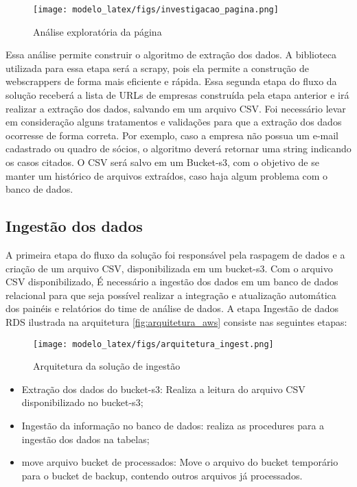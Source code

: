 \begin{figure}[H]
    \centering
    \texttt{[image: modelo\_latex/figs/investigacao\_pagina.png]}
    \caption{Análise exploratória da página}
    \label{fig:investigacao_pagina}
\end{figure}

Essa análise permite construir o algoritmo de extração dos dados. A biblioteca utilizada para essa etapa será a scrapy, pois ela permite a construção de webscrappers de forma mais eficiente e rápida. Essa segunda etapa do fluxo da solução receberá a lista de URLs de empresas construída pela etapa anterior e irá realizar a extração dos dados, salvando em um arquivo CSV. Foi necessário levar em consideração alguns tratamentos e validações para que a extração dos dados ocorresse de forma correta. Por exemplo, caso a empresa não possua um e-mail cadastrado ou quadro de sócios, o algoritmo deverá retornar uma string indicando os casos citados. O CSV será salvo em um Bucket-s3, com o objetivo de se manter um histórico de arquivos extraídos, caso haja algum problema com o banco de dados.

\subsection{Ingestão dos dados}

A primeira etapa do fluxo da solução foi responsável pela raspagem de dados e a criação de um arquivo CSV, disponibilizada em um bucket-s3. Com o arquivo CSV disponibilizado, É necessário a ingestão dos dados em um banco de dados relacional para que seja possível realizar a integração e atualização automática dos painéis e relatórios do time de análise de dados. A etapa Ingestão de dados RDS ilustrada na arquitetura \ref{fig:arquitetura_aws} consiste nas seguintes etapas:

\begin{figure}[H]
    \centering
    \texttt{[image: modelo\_latex/figs/arquitetura\_ingest.png]}
    \caption{Arquitetura da solução de ingestão}
    \label{fig:arquitetura_ingest}
\end{figure}

\begin{itemize}
    \item Extração dos dados do bucket-s3: Realiza a leitura do arquivo CSV disponibilizado no bucket-s3;
    \item Ingestão da informação no banco de dados: realiza as procedures para a ingestão dos dados na tabelas;
    \item move arquivo bucket de processados: Move o arquivo do bucket temporário para o bucket de backup, contendo outros arquivos já processados.
\end{itemize}


